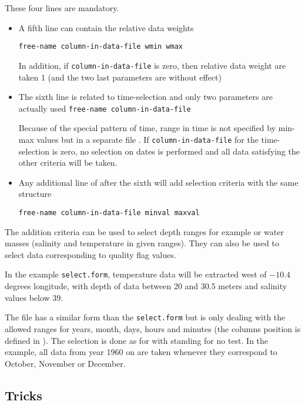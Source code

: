 These four lines are mandatory.


\begin{itemize}
\item

A fifth line can contain the relative data weights

{\tt free-name  column-in-data-file  wmin wmax}

In addition, if {\tt column-in-data-file} is zero, then relative data weight are taken 1 (and the two last parameters are without effect)

\item The sixth line is related to time-selection and only two parameters are actually used
{\tt free-name column-in-data-file}

Because of the special pattern of time, range in time is not specified by min-max values
but in a separate file . 
If {\tt column-in-data-file} for the time-selection is zero, no selection on dates is performed and all data satisfying the other criteria will be taken. 

\item 
Any additional line of  after the sixth will add selection criteria with the same structure

{\tt free-name column-in-data-file minval maxval}

\end{itemize}


The addition criteria can be used to select depth ranges for example or water masses (salinity and temperature in given ranges). They can also be used to select data corresponding to quality flag values.

In the example {\tt select.form}, temperature data will be extracted west of $-10.4$ degrees longitude, with depth
of data between 20 and 30.5 meters and salinity values below 39.

The file  has a similar form than the {\tt select.form} but is only dealing with the allowed
ranges for years, month, days, hours and minutes (the columns position is defined in ).
The selection is done as for  with {\tt *} standing for no test. 
In the example, all data from year 1960 on are taken whenever they correspond to October, November or December.

\subsection{Tricks}

